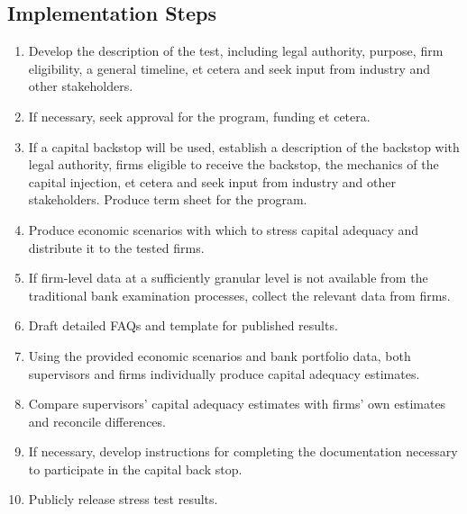 \documentclass[12pt]{article}
\begin{document}
\subsection{Implementation Steps}

\begin{enumerate}

\item Develop the description of the test, including legal authority, purpose, firm eligibility, a general timeline, et cetera and seek input from industry and other stakeholders.
\item If necessary, seek approval for the program, funding et cetera.
\item If a capital backstop will be used, establish a description of the backstop with legal authority, firms eligible to receive the backstop, the mechanics of the capital injection, et cetera and seek input from industry and other stakeholders. Produce term sheet for the program.
\item Produce economic scenarios with which to stress capital adequacy and distribute it to the tested firms.
\item If firm-level data at a sufficiently granular level is not available from the traditional bank examination processes, collect the relevant data from firms.
\item Draft detailed FAQs and template for published results.
\item Using the provided economic scenarios and bank portfolio data, both supervisors and firms individually produce capital adequacy estimates.
\item Compare supervisors' capital adequacy estimates with firms' own estimates and reconcile differences.
\item If necessary, develop instructions for completing the documentation necessary to participate in the capital back stop.
\item Publicly release stress test results.

\end{enumerate}
\end{document}
